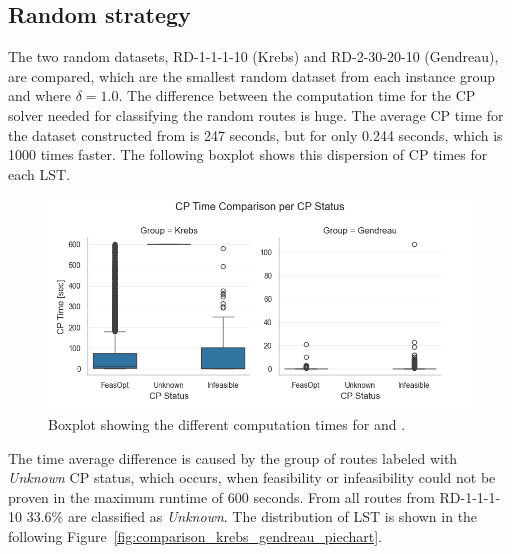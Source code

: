 \subsection{Random strategy}
\label{subsec:challenges_krebs_random}

The two random datasets, RD-1-1-1-10 (Krebs) and RD-2-30-20-10 (Gendreau), are compared, which are the smallest random dataset from each instance group and
where $\delta = 1.0$. The difference between the computation time for the \gls{CP} solver needed for classifying the random routes is huge. The average
\gls{CP} time for the dataset constructed from \krebsADataSetText is 247 seconds, but for \gendreauDataSetText only 0.244 seconds,
which is 1000 times faster. The following boxplot shows this dispersion of \gls{CP} times for each \gls{LST}.
\begin{figure}[ht]
	\centering
	\includegraphics[width=\textwidth]{pictures/comparison_krebs_gendreau/boxplot_cp_time.png}
	\caption{Boxplot showing the different computation times for \krebsADataSetText and \gendreauDataSet.}
	\label{fig:comparison_krebs_gendreau_boxplot}
\end{figure}

The time average difference is caused by the group of routes labeled with \textit{Unknown} \gls{CP} status, which occurs, when
feasibility or infeasibility could not be proven in the maximum runtime of 600 seconds. From all routes from RD-1-1-1-10
33.6\% are classified as \textit{Unknown}. The distribution of \gls{LST} is shown in the following Figure~\ref{fig:comparison_krebs_gendreau_piechart}.

